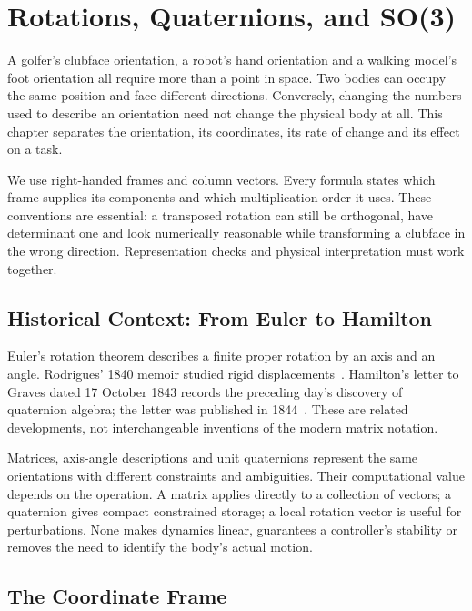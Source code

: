 \chapter{Rotations, Quaternions, and SO(3)}
\label{ch:rotations}


A golfer's clubface orientation, a robot's hand orientation and a walking model's foot orientation all require more than a point in space. Two bodies can occupy the same position and face different directions. Conversely, changing the numbers used to describe an orientation need not change the physical body at all. This chapter separates the orientation, its coordinates, its rate of change and its effect on a task.

We use right-handed frames and column vectors. Every formula states which frame supplies its components and which multiplication order it uses. These conventions are essential: a transposed rotation can still be orthogonal, have determinant one and look numerically reasonable while transforming a clubface in the wrong direction. Representation checks and physical interpretation must work together.

\section{Historical Context: From Euler to Hamilton}
\label{sec:rotation_history}
\label{laymans:context_box}

Euler's rotation theorem describes a finite proper rotation by an axis and an angle. Rodrigues' 1840 memoir studied rigid displacements~\cite{rodrigues1840}. Hamilton's letter to Graves dated 17 October 1843 records the preceding day's discovery of quaternion algebra; the letter was published in 1844~\cite{HamiltonQuaternionLetterReview}. These are related developments, not interchangeable inventions of the modern matrix notation.

Matrices, axis-angle descriptions and unit quaternions represent the same orientations with different constraints and ambiguities. Their computational value depends on the operation. A matrix applies directly to a collection of vectors; a quaternion gives compact constrained storage; a local rotation vector is useful for perturbations. None makes dynamics linear, guarantees a controller's stability or removes the need to identify the body's actual motion.

\section{The Coordinate Frame}
\label{sec:coordinate_frame}

